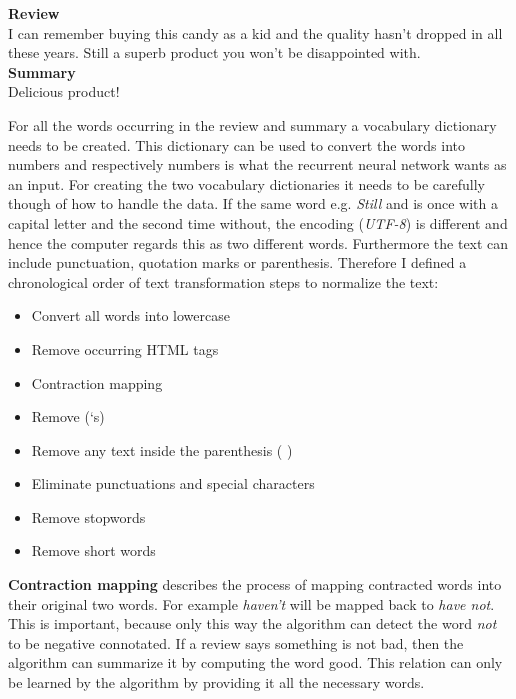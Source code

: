 \begin{tcolorbox}
	\textbf{Review} \\
	I can remember buying this candy as a kid and the quality hasn't dropped in all these years. Still a superb product you won't be disappointed with. \\
	
	\textbf{Summary} \\
	Delicious product!
\end{tcolorbox}

For all the words occurring in the review and summary a vocabulary dictionary needs to be created. This dictionary can be used to convert the words into numbers and respectively numbers is what the recurrent neural network wants as an input. For creating the two vocabulary dictionaries it needs to be carefully though of how to handle the data. If the same word e.g. \textit{Still} and  is once with a capital letter and the second time without, the encoding (\textit{UTF-8}) is different and hence the computer regards this as two different words. Furthermore the text can include punctuation, quotation marks or parenthesis. Therefore I defined a chronological order of text transformation steps to normalize the text:

\begin{tcolorbox}
	\begin{itemize}
		\item Convert all words into lowercase
		\item Remove occurring HTML tags
		\item Contraction mapping
		\item Remove (‘s)
		\item Remove any text inside the parenthesis ( )
		\item Eliminate punctuations and special characters
		\item Remove stopwords
		\item Remove short words
	\end{itemize}
\end{tcolorbox}

\textbf{Contraction mapping} describes the process of mapping contracted words into their original two words. For example \textit{haven't} will be mapped back to \textit{have not}. This is important, because only this way the algorithm can detect the word \textit{not} to be negative connotated. If a review says something is not bad, then the algorithm can summarize it by computing the word good. This relation can only be learned by the algorithm by providing it all the necessary words.

